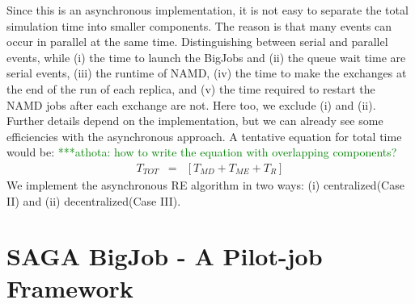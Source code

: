 \documentclass[a4paper,10pt]{article}
\newcommand{\alnote}[1]{ {\textcolor{blue} { ***andre: #1 }}}
\newcommand{\athotanote}[1]{ {\textcolor{green} { ***athota: #1 }}}
\newcommand{\alnote}[1]{}
\newcommand{\athotanote}[1]{}
\begin{document}
Since this is an asynchronous implementation, it is not easy to separate the total simulation time into smaller components. The reason is that many events can occur in parallel at the same time. Distinguishing between serial and parallel events, while (i) the time to launch the BigJobs and (ii) the queue wait time are serial events, (iii) the runtime of NAMD, (iv) the time to make the exchanges at the end of the run of each replica, and (v) the time required to restart the NAMD jobs after each exchange are not. %
Here too, we exclude (i) and (ii). Further details depend on the implementation, but we can already see some efficiencies with the asynchronous approach. A tentative equation for total time would be:
\athotanote{how to write the equation with overlapping components?}
  \begin{eqnarray}
T_{TOT} &=& [T_{MD} + T_{ME} + T_{R}]
\label{eq:equation 1}
\end{eqnarray}
We implement the asynchronous RE algorithm in two ways: (i) centralized(Case II) and (ii) decentralized(Case III).




\section{SAGA BigJob - A Pilot-job Framework}
\end{document}

